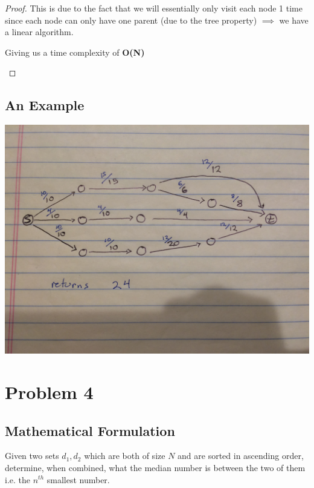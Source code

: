 \documentclass[12pt]{article}
\begin{document}
\begin{proof}
This is due to the fact that we will essentially only visit each node 1 time since each node can only have
one parent (due to the tree property) $\implies$ we have a linear algorithm.
\begin{center}
    Giving us a time complexity of \textbf{O(N)}
\end{center}
\end{proof}


\subsection{An Example}
\includegraphics[width=\textwidth]{example3}

\newpage






\section{Problem 4}
\subsection{Mathematical Formulation}
Given two sets $d_1, d_2$ which are both of size $N$ and are sorted in ascending order, determine, when combined,
what the median number is between the two of them i.e. the $n^{th}$ smallest number.
\end{document}
